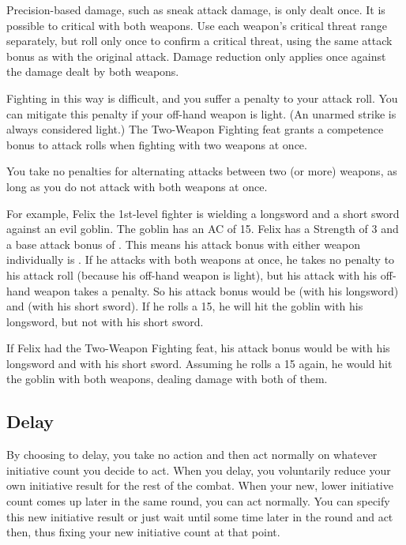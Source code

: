 \par Precision-based damage, such as sneak attack damage, is only dealt once. It is possible to critical with both weapons. Use each weapon's critical threat range separately, but roll only once to confirm a critical threat, using the same attack bonus as with the original attack. Damage reduction only applies once against the damage dealt by both weapons.

\par Fighting in this way is difficult, and you suffer a  penalty to your attack roll. You can mitigate this penalty if your off-hand weapon is light. (An unarmed strike is always considered light.) The Two-Weapon Fighting feat grants a  competence bonus to attack rolls when fighting with two weapons at once.

You take no penalties for alternating attacks between two (or more) weapons, as long as you do not attack with both weapons at once.

\par For example, Felix the 1st-level fighter is wielding a longsword and a short sword against an evil goblin. The goblin has an AC of 15. Felix has a Strength of 3 and a base attack bonus of . This means his attack bonus with either weapon individually is . If he attacks with both weapons at once, he takes no penalty to his attack roll (because his off-hand weapon is light), but his attack with his off-hand weapon takes a  penalty. So his attack bonus would be  (with his longsword) and  (with his short sword). If he rolls a 15, he will hit the goblin with his longsword, but not with his short sword.

\par If Felix had the Two-Weapon Fighting feat, his attack bonus would be  with his longsword and  with his short sword. Assuming he rolls a 15 again, he would hit the goblin with both weapons, dealing damage with both of them.

\subsection{Delay}
By choosing to delay, you take no action and then act normally on whatever initiative count you decide to act. When you delay, you voluntarily reduce your own initiative result for the rest of the combat. When your new, lower initiative count comes up later in the same round, you can act normally. You can specify this new initiative result or just wait until some time later in the round and act then, thus fixing your new initiative count at that point.

